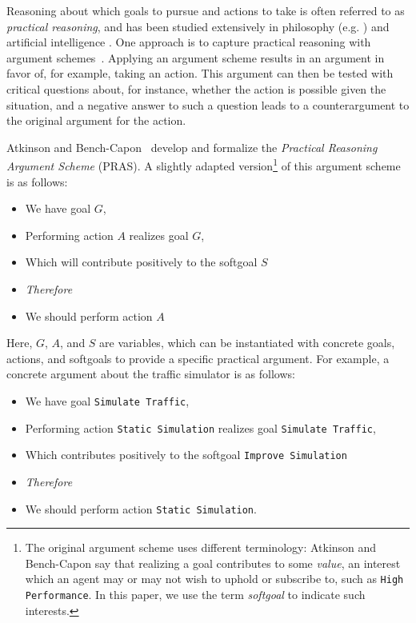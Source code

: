 Reasoning about which goals to pursue and actions to take is often referred to as \emph{practical reasoning}, and has been studied extensively in philosophy (e.g. \cite{Raz1978-RAZPR,walton1990}) and artificial intelligence \cite{bratman1987,atkinson2007}. One approach is to capture practical reasoning with argument schemes~\cite{walton1990}. Applying an argument scheme results in an argument in favor of, for example, taking an action. This argument can then be tested with critical questions about, for instance, whether the action is possible given the situation, and a negative answer to such a question leads to a counterargument to the original argument for the action. 

Atkinson and Bench-Capon~\cite{atkinson2007} develop and formalize the \emph{Practical Reasoning Argument Scheme} (PRAS). A slightly adapted version\footnote{The original argument scheme uses different terminology: Atkinson and Bench-Capon say that realizing a goal contributes to some \emph{value}, an interest which an agent may or may not wish to uphold or subscribe to, such as \texttt{High Performance}. In this paper, we use the term \emph{softgoal} to indicate such interests.} of this argument scheme is as follows:

\begin{itemize}
\item[] We have goal $G$,
\item[] Performing action $A$ realizes goal $G$,
\item[] Which will contribute positively to the softgoal $S$
\item[] \textit{Therefore} 
\item[] We should perform action $A$
\end{itemize}

Here, $G$, $A$, and $S$ are variables, which can be instantiated with concrete goals, actions, and softgoals to provide a specific practical argument. For example, a concrete argument about the traffic simulator is as follows: 
\begin{itemize}
\item[] We have goal \texttt{Simulate Traffic},
\item[] Performing action \texttt{Static Simulation} realizes goal \texttt{Simulate Traffic}, 
\item[] Which contributes positively to the softgoal \texttt{Improve Simulation} 
\item[] \textit{Therefore} 
\item[] We should perform action \texttt{Static Simulation}.
\end{itemize}

